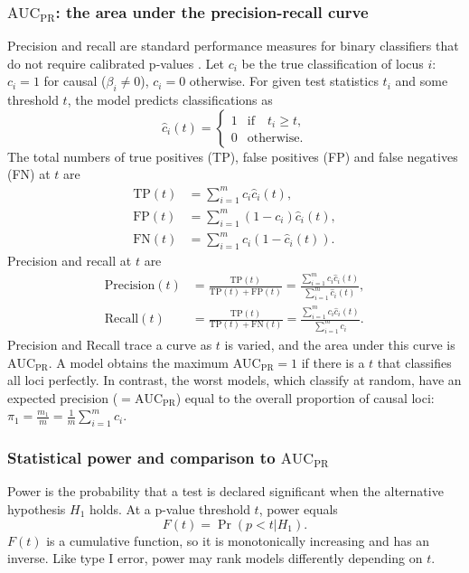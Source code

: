 \documentclass[11pt]{article}
\newcommand{\auc}{\text{AUC}_\text{PR}}
\begin{document}
\subsubsection{$\auc$: the area under the precision-recall curve}

Precision and recall are standard performance measures for binary classifiers that do not require calibrated p-values \citep{grau_prroc:_2015}.
Let $c_i$ be the true classification of locus $i$: $c_i = 1$ for causal ($\beta_i \ne 0$), $c_i = 0$ otherwise.
For given test statistics $t_i$ and some threshold $t$, the model predicts classifications as
$$
\hat{c}_i(t) =
\begin{cases}
  1 & \text{if} \quad t_i \ge t, \\
  0 & \text{otherwise}.
\end{cases}
$$
The total numbers of true positives (TP), false positives (FP) and false negatives (FN) at $t$ are
\begin{align*}
  \text{TP}(t)
  &=
    \sum_{i = 1}^m c_i \hat{c}_i(t)
    , \\
  \text{FP}(t)
  &=
    \sum_{i = 1}^m (1 - c_i) \hat{c}_i(t)
    , \\
  \text{FN}(t)
  &=
    \sum_{i = 1}^m c_i \left( 1 - \hat{c}_i(t) \right)
    .
\end{align*}
Precision and recall at $t$ are
\begin{align*}
  \text{Precision}(t)
  &=
    \frac{ \text{TP}(t) }{ \text{TP}(t) + \text{FP}(t) }
    =
    \frac{ \sum_{i = 1}^m c_i \hat{c}_i(t) }{ \sum_{i = 1}^m \hat{c}_i(t) }
    , \\
  \text{Recall}(t)
  &=
    \frac{ \text{TP}(t) }{ \text{TP}(t) + \text{FN}(t) }
    =
    \frac{ \sum_{i = 1}^m c_i \hat{c}_i(t) }{ \sum_{i = 1}^m c_i }
    .
\end{align*}
Precision and Recall trace a curve as $t$ is varied, and the area under this curve is $\auc$.
A model obtains the maximum $\auc = 1$ if there is a $t$ that classifies all loci perfectly.
In contrast, the worst models, which classify at random, have an expected precision ($= \auc$) equal to the overall proportion of causal loci:
$\pi_1 = \frac{m_1}{m} = \frac{1}{m} \sum_{i = 1}^m c_i$.

\subsubsection{Statistical power and comparison to $\auc$}

Power is the probability that a test is declared significant when the alternative hypothesis $H_1$ holds.
At a p-value threshold $t$, power equals
$$
F(t) = \Pr( p < t | H_1 ).
$$
$F(t)$ is a cumulative function, so it is monotonically increasing and has an inverse.
Like type I error, power may rank models differently depending on $t$.
\end{document}
